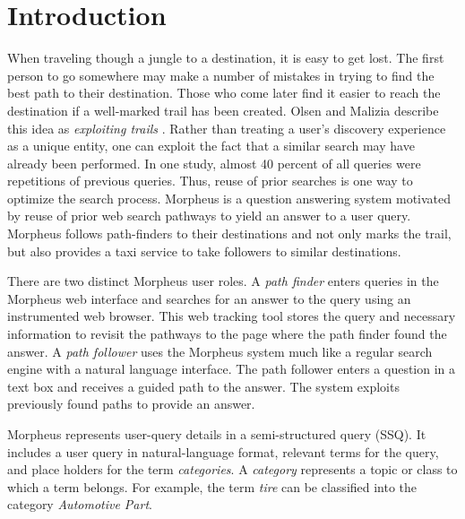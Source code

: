 \section{Introduction}



When traveling though a jungle to a destination, it is easy to get
lost.  The first person to go somewhere may make a number of mistakes
in trying to find the best path to their destination. Those
who come later find it easier to reach the destination if a
well-marked trail has been created. Olsen and Malizia describe this
idea as \emph{exploiting trails} \cite{5379671}.  Rather than treating
a user's discovery experience as a unique entity, one can exploit the fact that a similar search may have already been
performed.  In one study, almost 40 percent of all queries
were repetitions of previous queries\cite{1277770}. Thus, reuse of prior searches is one way to optimize the search
process.  Morpheus is a question answering system motivated by reuse of prior
web search pathways to yield an answer to a user query. Morpheus follows path-finders to their destinations and not only marks the
trail, but also provides a taxi service to take followers to similar
destinations.

There are two distinct Morpheus user roles. A
\textit{path finder} enters queries in the Morpheus web interface and
searches for an answer to the query using an instrumented web browser. 
This web tracking tool stores the query
and necessary information to revisit the pathways to the page where the path finder 
found the answer. A \textit{path follower} uses the Morpheus system much like a regular search engine with a natural language interface. The path follower enters a question in a text box and receives a guided path to the answer. The system exploits previously found paths to provide an answer.

Morpheus represents user-query details in a semi-structured query (SSQ). It includes a user query in natural-language format, relevant terms for the query, and place holders for the term \textit{categories}. A \textit{category} represents a
topic or class to which a term belongs. For example, the term \textit{tire} can be classified into the category \textit{Automotive Part}.

